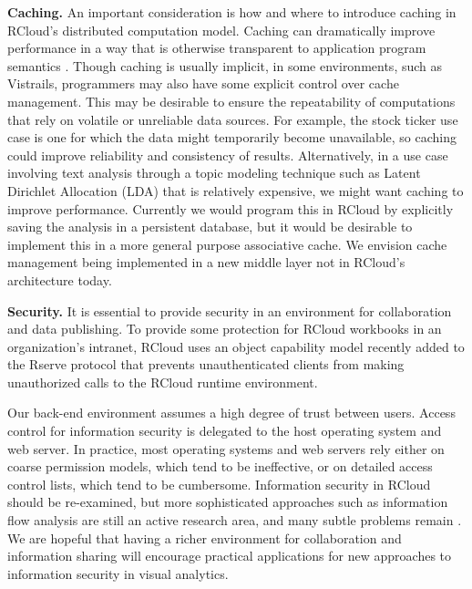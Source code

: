 {\bf Caching.}
An important consideration is how and where to introduce caching
in RCloud's distributed computation model. Caching can dramatically
improve performance in a way that is otherwise transparent to
application program semantics \cite{Callahan:2006:VVM, Guo:2010:TPI}.
Though caching is usually implicit, in some environments, such as
Vistrails, programmers may also have some explicit control over cache
management. This may be desirable to ensure the repeatability of
computations that rely on volatile or unreliable data sources.
For example, the stock ticker use case is one for which the data
might temporarily become unavailable, so caching could improve
reliability and consistency of results.  Alternatively, in a use case
involving text analysis through a topic modeling technique such as
Latent Dirichlet Allocation (LDA) that is relatively expensive,
we might want caching to improve performance. Currently we would
program this in RCloud by explicitly saving the analysis in a
persistent database, but it would be desirable to implement this
in a more general purpose associative cache. We envision cache
management being implemented in a new middle layer not in RCloud's
architecture today.

{\bf Security.}
It is essential to provide security in an environment for
collaboration and data publishing. To provide some
protection for RCloud workbooks in an organization's intranet,
RCloud uses an object capability model
\cite{Miller:2006:RCT}
recently added to the Rserve protocol \cite{Urbanek:2003:AFW}
that prevents unauthenticated clients from making
unauthorized calls to the RCloud runtime environment.

Our back-end environment assumes a high degree of trust between users.
Access control for information security is delegated to the host
operating system and web server. In practice, most operating
systems and web servers rely either on coarse permission models,
which tend to be ineffective, or on detailed access control
lists, which tend to be cumbersome. 
Information security in RCloud should be re-examined, but more
sophisticated approaches such as information flow analysis are
still an active research area, and many subtle problems remain
\cite{Moore:2011:SAF}. We are hopeful that having a richer
environment for collaboration and information sharing will encourage
practical applications for new approaches to information security
in visual analytics.
